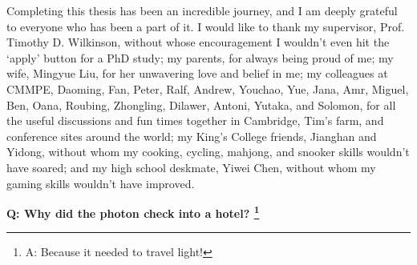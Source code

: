 
\begin{acknowledgements}

Completing this thesis has been an incredible journey, and I am deeply grateful to everyone who has been a part of it. I would like to thank my supervisor, Prof. Timothy D. Wilkinson, without whose encouragement I wouldn't even hit the `apply' button for a PhD study; my parents, for always being proud of me; my wife, Mingyue Liu, for her unwavering love and belief in me; my colleagues at CMMPE, Daoming, Fan, Peter, Ralf, Andrew, Youchao, Yue, Jana, Amr, Miguel, Ben, Oana, Roubing, Zhongling, Dilawer, Antoni, Yutaka, and Solomon, for all the useful discussions and fun times together in Cambridge, Tim's farm, and conference sites around the world; my King's College friends, Jianghan and Yidong, without whom my cooking, cycling, mahjong, and snooker skills wouldn't have soared; and my high school deskmate, Yiwei Chen, without whom my gaming skills wouldn't have improved.

\begin{center}
    \textbf{Q: Why did the photon check into a hotel? \footnote{A: Because it needed to travel light!}}
\end{center}


\end{acknowledgements}
